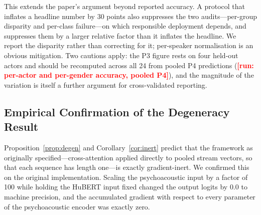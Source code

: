 \documentclass[journal,onecolumn,11pt,draftclsnofoot]{IEEEtran}   %
\newcommand{\TORUN}[1]{\textcolor{red}{\textbf{[run: #1]}}}
\newcommand{\TORUN}[1]{}
\begin{document}
\begin{table}[!t]
\centering\small
\caption{Contamination conceals the fairness failure. Same architecture, same
features, same seed; only the evaluation protocol differs. A disparity audit run
under P1 would report near-parity for a system that is 21.6 points worse on male
speakers.}
\label{tab:fairness}
\end{table}

This extends the paper's argument beyond reported accuracy. A protocol that
inflates a headline number by 30 points also suppresses the two audits---per-group disparity and per-class failure---on which responsible deployment depends,
and suppresses them by a larger relative factor than it inflates the headline.
We report the disparity rather than correcting for it; per-speaker normalisation
is an obvious mitigation. Two cautions apply: the P3 figure rests on four
held-out actors and should be recomputed across all 24 from pooled P4
predictions (\TORUN{per-actor and per-gender accuracy, pooled P4}), and the
magnitude of the variation is itself a further argument for cross-validated
reporting.

\subsection{Empirical Confirmation of the Degeneracy Result}
\label{sec:degeneracy}
Proposition~\ref{prop:degen} and Corollary~\ref{cor:inert} predict that the
framework as originally specified---cross-attention applied directly to pooled
stream vectors, so that each sequence has length one---is exactly
gradient-inert. We confirmed this on the original implementation. Scaling the
psychoacoustic input by a factor of 100 while holding the HuBERT input fixed
changed the output logits by $0.0$ to machine precision, and the accumulated
gradient with respect to every parameter of the psychoacoustic encoder was
exactly zero.
\end{document}
